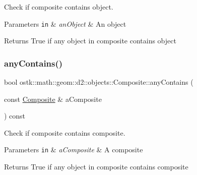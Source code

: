 Check if composite contains object. 


\begin{DoxyParams}[1]{Parameters}
\mbox{\tt in}  & {\em an\+Object} & An object \\
\hline
\end{DoxyParams}
\begin{DoxyReturn}{Returns}
True if any object in composite contains object 
\end{DoxyReturn}
\mbox{\label{classostk_1_1math_1_1geom_1_1d2_1_1objects_1_1_composite_a6327353542f751e022f8c2549293f433}} 
\subsubsection{\texorpdfstring{any\+Contains()}{anyContains()}\hspace{0.1cm}{\footnotesize\ttfamily [2/2]}}
{\footnotesize\ttfamily bool ostk\+::math\+::geom\+::d2\+::objects\+::\+Composite\+::any\+Contains (\begin{DoxyParamCaption}\item[{const \hyperlink{classostk_1_1math_1_1geom_1_1d2_1_1objects_1_1_composite}{Composite} \&}]{a\+Composite }\end{DoxyParamCaption}) const}



Check if composite contains composite. 


\begin{DoxyParams}[1]{Parameters}
\mbox{\tt in}  & {\em a\+Composite} & A composite \\
\hline
\end{DoxyParams}
\begin{DoxyReturn}{Returns}
True if any object in composite contains composite 
\end{DoxyReturn}
\mbox{\label{classostk_1_1math_1_1geom_1_1d2_1_1objects_1_1_composite_ad7c787dc3c919a060e075902c0909413}} 
